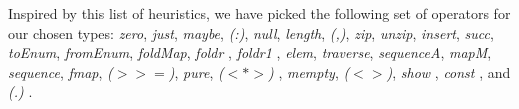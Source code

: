 \documentclass{article}
\begin{document}
Inspired by this list of heuristics,
we have picked the following set of operators for our chosen types:
\emph{zero}, %
\emph{just}, %
\emph{maybe}, %
\emph{(:)}, %
\emph{null}, %
\emph{length}, %
\emph{(,)}, %
\emph{zip}, %
\emph{unzip}, %
\emph{insert}, %
\emph{succ}, %
\emph{toEnum}, %
\emph{fromEnum}, %
\emph{foldMap}, %
\emph{foldr}%
, %
\emph{foldr1}%
, %
\emph{elem}, %
\emph{traverse}, %
\emph{sequenceA}, %
\emph{mapM}, %
\emph{sequence}, %
\emph{fmap}, %
\emph{($>>=$)}, %
\emph{pure}, %
\emph{($<*>$)}%
, %
\emph{mempty}, %
\emph{($<>$)}, %
\emph{show}%
, %
\emph{const}%
,
and \emph{(.)}%
. %

\end{document}
